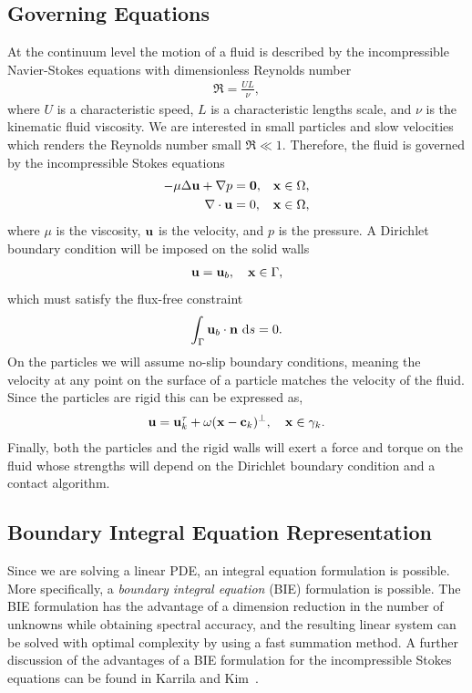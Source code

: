 \documentclass[preprint, 10pt]{elsarticle}
\begin{document}
\subsection{Governing Equations}\label{sec:governing}
At the continuum level the motion of a fluid is described by the
incompressible Navier-Stokes equations with dimensionless Reynolds
number
\begin{align*}
  \Re = \frac{UL}{\nu},
\end{align*}
where $U$ is a characteristic speed, $L$ is a characteristic lengths
scale, and $\nu$ is the kinematic fluid viscosity.  We are interested in
small particles and slow velocities which renders the Reynolds number
small $\Re \ll 1$.  Therefore, the fluid is governed by the
incompressible Stokes equations
\begin{equation}
  \label{eq:stokes}
  \begin{aligned}
  -\mu\Delta \mathbf{u} + \nabla p &= \mathbf{0},
    &&{\mathbf{x}} \in \Omega, \\	  
  \nabla\cdot\mathbf{u} &= 0, && {\mathbf{x}} \in \Omega,
  \end{aligned}
\end{equation}
where $\mu$ is the viscosity, ${\mathbf{u}}$ is the velocity, and $p$ is the
pressure.  A Dirichlet boundary condition will be imposed on the solid
walls
\begin{align}
  \label{eq:boundary_condition}
  \mathbf{u} = \mathbf{u}_b, \quad {\mathbf{x}} \in \Gamma,
\end{align}
which must satisfy the flux-free constraint 
\begin{align*}
  \int_{\Gamma} {\mathbf{u}}_b\cdot{\mathbf{n}}~\text{d}s = 0.
\end{align*}
On the particles we will assume no-slip boundary conditions, meaning the
velocity at any point on the surface of a particle matches the velocity
of the fluid.  Since the particles are rigid this can be expressed as,
\begin{align}
  \label{eq:particles_noslip}
  {\mathbf{u}} = {\mathbf{u}}^\tau_k + \omega({\mathbf{x}}-{\mathbf{c}}_k)^\perp, \quad {\mathbf{x}} \in \gamma_k.
\end{align}
Finally, both the particles and the rigid walls will exert a force and
torque on the fluid whose strengths will depend on the Dirichlet
boundary condition and a contact algorithm.

\subsection{Boundary Integral Equation Representation}
Since we are solving a linear PDE, an integral equation formulation is
possible.  More specifically, a {\em boundary integral equation} (BIE)
formulation is possible.  The BIE formulation has the advantage of a
dimension reduction in the number of unknowns while obtaining spectral
accuracy, and the resulting linear system can be solved with optimal
complexity by using a fast summation method.  A further discussion of
the advantages of a BIE formulation for the incompressible Stokes
equations can be found in Karrila and Kim~\cite{Karrila1989}.
\end{document}
